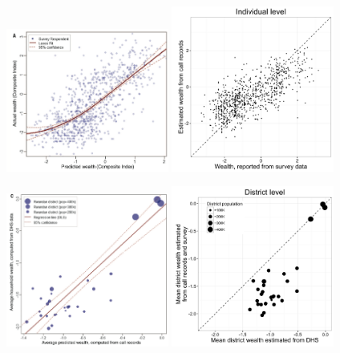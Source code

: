 \documentclass[aspectratio=169]{beamer}
\begin{document}
\begin{frame}

\begin{center}
\includegraphics[width=0.4\textwidth]{figures/blumenstock_predicting_2015_fig1a}
\includegraphics[width=0.4\textwidth]{figures/blumenstock_predicting_2015_fig1a_replotted}
\end{center}

\end{frame}
\begin{frame}

\begin{center}
\includegraphics[width=0.4\textwidth]{figures/blumenstock_predicting_2015_fig3c}
\includegraphics[width=0.4\textwidth]{figures/blumenstock_predicting_2015_fig3c_replotted}
\end{center}

\end{frame}
\end{document}
